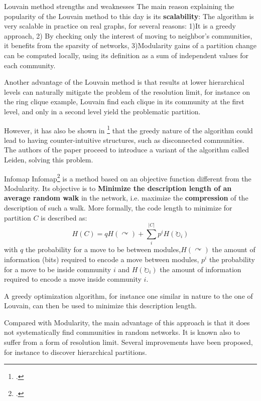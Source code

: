 \begin{textbox}{Louvain method strengths and weaknesses}
    The main reason explaining the popularity of the Louvain method to this day is its
    \textbf{scalability}: The algorithm is very scalable in practice on real graphs, for several reasons: 1)It is a greedy approach, 2) By checking only the interest of moving to neighbor's communities, it benefits from the sparsity of networks, 3)Modularity gains of a partition change can be computed locally, using its definition as a sum of independent values for each community.

    Another advantage of the Louvain method is that results at lower hierarchical levels can naturally mitigate the problem of the resolution limit, for instance on the ring clique example, Louvain find each clique in its community at the first level, and only  in a second level yield the problematic partition.

    However, it has also be shown in \footcite{traag2019louvain} that the greedy nature of the algorithm could lead to having counter-intuitive structures, such as disconnected communities. The authors of  the paper proceed to introduce a variant of the algorithm called Leiden, solving this problem.
\end{textbox}

\begin{textbox}{Infomap}
    Infomap\footcite{rosvall2008maps} is a method based on an objective function different from the Modularity. Its objective is to \textbf{Minimize the description length of an average random walk} in the network, i.e. maximize the \textbf{compression} of the description of such a walk. More formally, the code length to minimize for partition $C$ is described as:
    \[
        H(C)=qH(\curvearrowright)+\sum_i^{|C|}p^iH(\circlearrowright_i)
    \]
    with $q$ the probability for a move to be between modules,$H(\curvearrowright)$ the amount of information (bits) required to encode a move between modules, $p^i$ the probability for a move to be inside community $i$ and $H(\circlearrowright_i)$ the amount of information required to encode a move inside community $i$.

    A greedy optimization algorithm, for instance one similar in nature to the one of Louvain, can then be used to minimize this description length.

    Compared with Modularity, the main advantage of this approach is that it does not systematically find communities in random networks. It is known also to suffer from a form of resolution limit.
    Several improvements have been proposed, for instance to discover hierarchical partitions.
\end{textbox}

